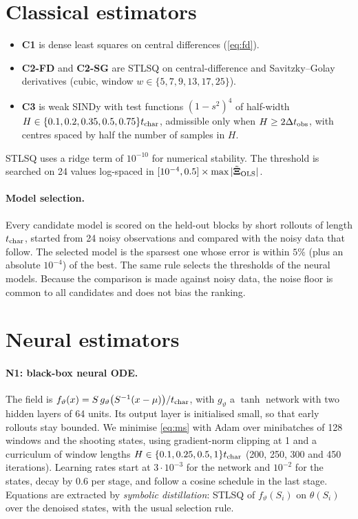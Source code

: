 \section{Classical estimators}

\begin{itemize}
  \item \textbf{C1} is dense least squares on central differences (\cref{eq:fd}).
  \item \textbf{C2-FD} and \textbf{C2-SG} are STLSQ on central-difference and Savitzky--Golay derivatives (cubic, window $w\in\{5,7,9,13,17,25\}$).
  \item \textbf{C3} is weak SINDy with test functions $(1-s^2)^4$ of half-width $H\in\{0.1,0.2,0.35,0.5,0.75\}t_{\mathrm{char}}$, admissible only when $H\ge2\Delta t_{\mathrm{obs}}$, with centres spaced by half the number of samples in $H$.
\end{itemize}
STLSQ uses a ridge term of $10^{-10}$ for numerical stability. The threshold is searched on 24 values log-spaced in $[10^{-4},0.5]\times\max|\tilde{\bm{\Xi}}_{\rm OLS}|$.

\paragraph{Model selection.} Every candidate model is scored on the held-out blocks by short rollouts of length $t_{\mathrm{char}}$, started from 24 noisy observations and compared with the noisy data that follow. The selected model is the sparsest one whose error is within $5\%$ (plus an absolute $10^{-4}$) of the best. The same rule selects the thresholds of the neural models. Because the comparison is made against noisy data, the noise floor is common to all candidates and does not bias the ranking.

\section{Neural estimators}

\paragraph{N1: black-box neural ODE.} The field is $f_\vartheta(x)=S\,g_\vartheta\big(S^{-1}(x-\mu)\big)/t_{\mathrm{char}}$, with $g_\vartheta$ a $\tanh$ network with two hidden layers of 64 units. Its output layer is initialised small, so that early rollouts stay bounded. We minimise \eqref{eq:ms} with Adam \parencite{kingma2015adam} over minibatches of 128 windows and the shooting states, using gradient-norm clipping at 1 and a curriculum of window lengths $H\in\{0.1,0.25,0.5,1\}t_{\mathrm{char}}$ (200, 250, 300 and 450 iterations). Learning rates start at $3\cdot10^{-3}$ for the network and $10^{-2}$ for the states, decay by $0.6$ per stage, and follow a cosine schedule in the last stage. Equations are extracted by \emph{symbolic distillation}: STLSQ of $f_\vartheta(S_i)$ on $\theta(S_i)$ over the denoised states, with the usual selection rule.

